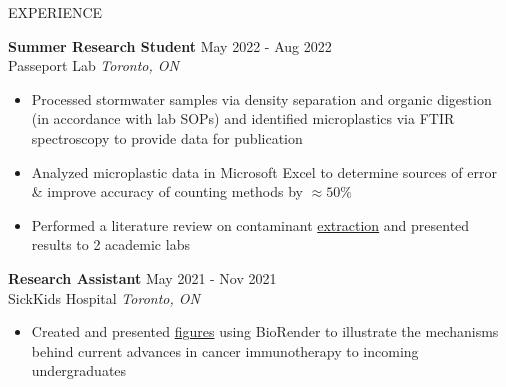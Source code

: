 \documentclass{resume}
\begin{document}
\begin{rSection}{EXPERIENCE}

\textbf{Summer Research Student} \hfill May 2022 - Aug 2022\\
Passeport Lab \hfill \textit{Toronto, ON}
\vspace{-0.2cm}
 \begin{itemize}
    \itemsep -8pt {} 
    \item Processed stormwater samples via density separation and organic digestion (in accordance with lab SOPs) and identified microplastics via FTIR spectroscopy to provide data for publication 
    \item Analyzed microplastic data in Microsoft Excel to determine sources of error \& improve accuracy of counting methods by $\approx50\%$
    \item Performed a literature review on contaminant \href{https://drive.google.com/file/d/1tVPh5Zt4zLT8spiLfzJ4vu0XZSuMfOfu/view}{extraction} and presented results to 2 academic labs

 \end{itemize}
 
\textbf{Research Assistant} \hfill May 2021 - Nov 2021\\
SickKids Hospital \hfill \textit{Toronto, ON}
\vspace{-0.2cm}
 \begin{itemize}
    \itemsep -8pt {} 
     \item Created and presented \href{https://drive.google.com/file/d/1459llsxjfB4-UA4sHfnBQ7wem0znVUL5/view?usp=sharing}{figures} using BioRender to illustrate the mechanisms behind current advances in cancer immunotherapy to incoming undergraduates
 \end{itemize}


\end{rSection}
\end{document}
